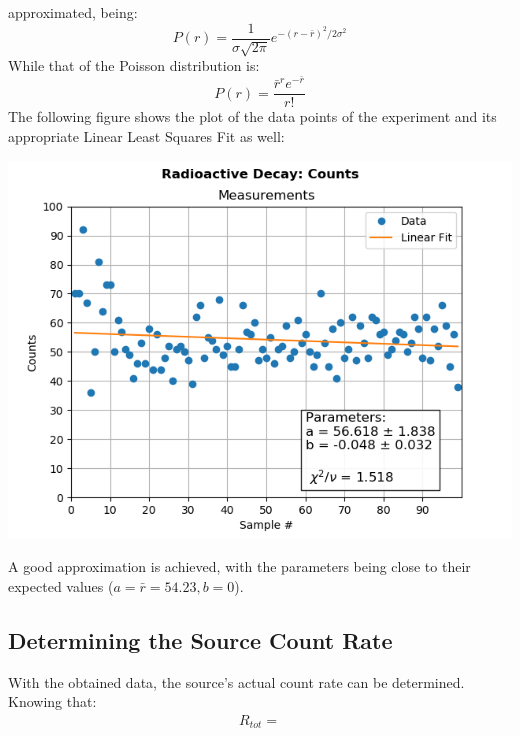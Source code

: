 \documentclass[twocolumn]{article}
\begin{document}
 approximated, being:
 \begin{equation*}
  P(r) = \frac{1}{\sigma\sqrt{2\pi}} e^{-(r-\bar{r})^2 / 2\sigma^2}
 \end{equation*}
 While that of the Poisson distribution is:
 \begin{equation*}
  P(r) = \frac{\bar{r}^r e^{-\bar{r}}}{r!}
 \end{equation*}
  The following figure shows the plot of the data points of the experiment and its appropriate Linear Least Squares Fit as well:
 \centerline{\includegraphics[scale = 0.6]{fig3d}}
 A good approximation is achieved, with the parameters being close to their expected values ($a = \bar{r} = 54.23, b = 0$).
 \vfill\eject
 \subsection{Determining the Source Count Rate}
 With the obtained data, the source's actual count rate can be determined. Knowing that:
 \begin{align*}
  R_{tot} = 
 \end{align*}

 
\end{document}
